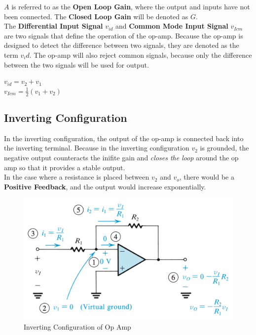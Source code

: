 \documentclass[11pt]{article}
\begin{document}
    $A$ is referred to as the \textbf{Open Loop Gain}, where the output and inputs have not been connected. The \textbf{Closed Loop Gain} will be denoted as $G$. \\ 

    The \textbf{Differential Input Signal} $v_{id}$ and \textbf{Common Mode Input Signal} $v_{Icm}$ are two signals that define the operation of the op-amp. Because the op-amp is designed to detect the difference between two signals, they are denoted as the term $v_id$. The op-amp will also reject common signals, because only the difference between the two signals will be used for output.

    \begin{center}
        $v_{id} = v_2 + v_1$ \\
        $v_{Icm} = \frac{1}{2}(v_1 + v_2)$ 
    \end{center}

    \subsection{Inverting Configuration}

    In the inverting configuration, the output of the op-amp is connected back into the inverting terminal. Because in the inverting configuration $v_2$ is grounded, the negative output counteracts the inifite gain and \textit{closes the loop} around the op amp so that it provides a stable output. \\
    
    In the case where a resistance is placed between $v_2$ and $v_o$, there would be a \textbf{Positive Feedback}, and the output would increase exponentially.
   
    \begin{figure}[h]
        \centering
        \includegraphics[width=\textwidth]{invert}
        \caption{Inverting Configuration of Op Amp}
        \label{fig:inverting }
    \end{figure}
\end{document}
